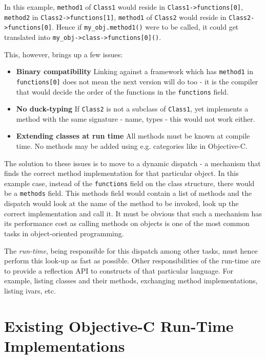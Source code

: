 In this example, \verb=method1= of \verb=Class1= would reside in \verb=Class1->functions[0]=, \verb=method2= in \verb=Class2->functions[1]=, \verb=method1= of \verb=Class2= would reside in \newline{}\verb=Class2->functions[0]=. Hence if \verb=my_obj.method1()= were to be called, it could get translated into \verb=my_obj->class->functions[0]()=.

This, however, brings up a few issues:

\begin{itemize}
  \item{\bf{Binary compatibility}} Linking against a framework which has \verb=method1= in \verb=functions[0]= does not mean the next version will do too - it is the compiler that would decide the order of the functions in the \verb=functions= field.
  \item{\bf{No duck-typing}} If \verb=Class2= is not a subclass of \verb=Class1=, yet implements a method with the same signature - name, types - this would not work either.
  \item{\bf{Extending classes at run time}} All methods must be known at compile time. No methods may be added using e.g. categories like in Objective-C.
\end{itemize}

The solution to these issues is to move to a dynamic dispatch - a mechanism that finds the correct method implementation for that particular object. In this example case, instead of the \verb=functions= field on the class structure, there would be a \verb=methods= field. This methods field would contain a list of methods and the dispatch would look at the name of the method to be invoked, look up the correct implementation and call it. It must be obvious that such a mechanism has its performance cost as calling methods on objects is one of the most common tasks in object-oriented programming.

The \emph{run-time}, being responsible for this dispatch among other tasks, must hence perform this look-up as fast as possible. Other responsibilities of the run-time are to provide a reflection API to constructs of that particular language. For example, listing classes and their methods, exchanging method implementations, listing ivars, etc.


\section{Existing Objective-C Run-Time Implementations}

